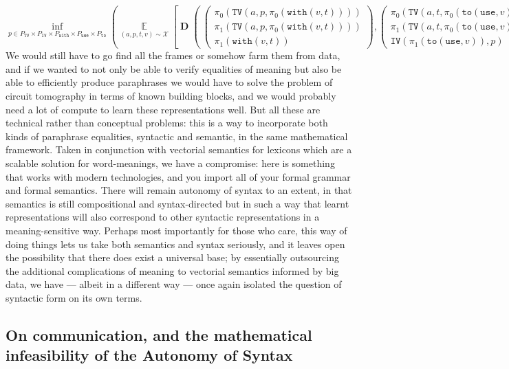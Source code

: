 \[\mathop{\text{inf}}\limits_{p \in P_{\texttt{TV}} \times P_{\texttt{IV}} \times P_{\texttt{with}} \times P_{\texttt{use}} \times P_{\texttt{to}}}\left( \mathop{\mathbb{E}}\limits_{(a,p,t,v) \sim \mathcal{X}} \left[ \mathop{\mathbf{D}} \left( \ \begin{pmatrix} \pi_0(\texttt{TV}(a,p,\pi_0(\texttt{with}(v,t)))) \\ \pi_1(\texttt{TV}(a,p,\pi_0(\texttt{with}(v,t)))) \\ \pi_1(\texttt{with}(v,t)) \end{pmatrix} , \begin{pmatrix} \pi_0(\texttt{TV}(a,t,\pi_0(\texttt{to}(\texttt{use},v))))) \\ \pi_1(\texttt{TV}(a,t,\pi_0(\texttt{to}(\texttt{use},v))))) \\ \texttt{IV}(\pi_1(\texttt{to}(\texttt{use},v)),p) \end{pmatrix} \ \right) \right] \right)\]
We would still have to go find all the frames or somehow farm them from data, and if we wanted to not only be able to verify equalities of meaning but also be able to efficiently produce paraphrases we would have to solve the problem of circuit tomography in terms of known building blocks, and we would probably need a lot of compute to learn these representations well. But all these are technical rather than conceptual problems: this is a way to incorporate both kinds of paraphrase equalities, syntactic and semantic, in the same mathematical framework. Taken in conjunction with vectorial semantics for lexicons which are a scalable solution for word-meanings, we have a compromise: here is something that works with modern technologies, and you import all of your formal grammar and formal semantics. There will remain autonomy of syntax to an extent, in that semantics is still compositional and syntax-directed but in such a way that learnt representations will also correspond to other syntactic representations in a meaning-sensitive way. Perhaps most importantly for those who care, this way of doing things lets us take both semantics and syntax seriously, and it leaves open the possibility that there does exist a universal base; by essentially outsourcing the additional complications of meaning to vectorial semantics informed by big data, we have --- albeit in a different way --- once again isolated the question of syntactic form on its own terms.

\subsection{On communication, and the mathematical infeasibility of the Autonomy of Syntax}

